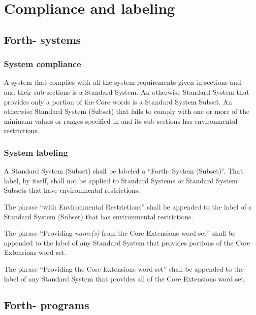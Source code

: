 
\chapter{Compliance and labeling}
\label{label}

\section{Forth-\snapshot{} systems} %
\label{label:label}

\subsection{System compliance} %
\label{label:system}

A system that complies with all the system requirements given in
sections  and  and their sub-sections is
a Standard System. An otherwise Standard System that provides only
a portion of the Core words is a Standard System Subset. An
otherwise Standard System (Subset) that fails to comply with one or
more of the minimum values or ranges specified in  and
its sub-sections has environmental restrictions.

\subsection{System labeling} %

A Standard System (Subset) shall be labeled a ``Forth-\snapshot{} System
(Subset)''. That label, by itself, shall not be applied to Standard
Systems or Standard System Subsets that have environmental
restrictions.

The phrase ``with Environmental Restrictions'' shall be appended to
the label of a Standard System (Subset) that has environmental
restrictions.

The phrase ``Providing \emph{name(s)} from the Core Extensions word
set'' shall be appended to the label of any Standard System that
provides portions of the Core Extensions word set.

The phrase ``Providing the Core Extensions word set'' shall be
appended to the label of any Standard System that provides all of
the Core Extensions word set.

\section{Forth-\snapshot{} programs} %

